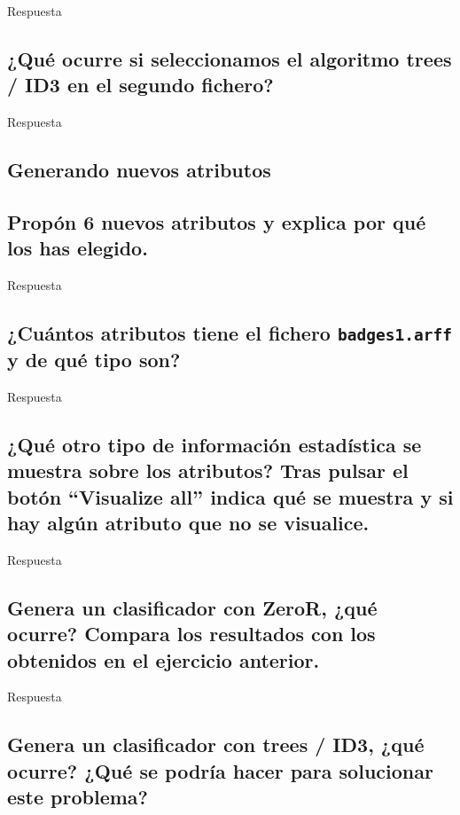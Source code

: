 \documentclass[12pt]{article}
\begin{document}
Respuesta

\subsection{\small ¿Qué ocurre si seleccionamos el algoritmo trees / ID3 en el segundo
fichero?}

Respuesta

\newpage

\begin{center}
\section{Generando nuevos atributos}
\end{center}

\subsection{\small Propón 6 nuevos atributos y explica por qué los has elegido.}

Respuesta

\subsection{\small ¿Cuántos atributos tiene el fichero \texttt{badges1.arff} y de qué tipo
son?}

Respuesta

\subsection{\small ¿Qué otro tipo de información estadística se muestra sobre los
atributos? Tras pulsar el botón ``Visualize all'' indica qué se muestra y si
hay algún atributo que no se visualice.}

Respuesta

\subsection{\small Genera un clasificador con ZeroR, ¿qué ocurre? Compara los resultados con
los obtenidos en el ejercicio anterior.}

Respuesta

\subsection{\small Genera un clasificador con trees / ID3, ¿qué ocurre? ¿Qué se podría hacer
para solucionar este problema?}
\end{document}
